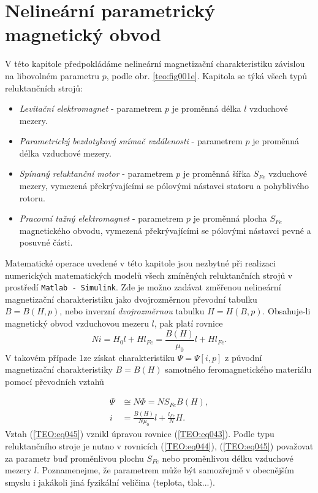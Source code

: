   \section{Nelineární parametrický magnetický obvod}
    V této kapitole předpokládáme nelineární magnetizační charakteristiku závislou na libovolném 
    parametru \(p\), podle obr. \ref{teo:fig001e}. Kapitola se týká všech typů reluktančních strojů:
    \begin{itemize}
      \item  \emph{Levitační elektromagnet} - parametrem \(p\) je proměnná délka \(l\) vzduchové 
             mezery.
      \item \emph{Parametrický bezdotykový snímač vzdálenosti} - parametrem \(p\) je proměnná délka 
            vzduchové mezery.
      \item \emph{Spínaný reluktanční motor} - parametrem \(p\) je proměnná šířka \(S_{Fe}\) 
            vzduchové mezery, vymezená překrývajícími se pólovými nástavci statoru a pohyblivého 
            rotoru.
      \item \emph{Pracovní tažný elektromagnet} - parametrem \(p\) je proměnná plocha \(S_{Fe}\)    
            magnetického obvodu, vymezená překrývajícími se pólovými nástavci pevné a posuvné části.
    \end{itemize}
    
    Matematické operace uvedené v této kapitole jsou nezbytné při realizaci numerických 
    matematických modelů všech zmíněných reluktančních strojů v prostředí \texttt{Matlab - 
    Simulink}. Zde je možno zadávat změřenou nelineární magnetizační charakteristiku jako 
    dvojrozměrnou převodní tabulku \(B = B(H,p)\), nebo inverzní \emph{dvojrozměrnou} tabulku \(H = 
    H(B, p)\). Obsahuje-li magnetický obvod vzduchovou mezeru \(l\), pak platí rovnice
    \begin{equation}\label{TEO:eq043}
      Ni = H_0l + Hl_{Fe} = \frac{B(H)}{\mu_0}l + Hl_{Fe}.
    \end{equation}
    V takovém případe 1ze získat charakteristiku \(\Psi = \Psi[i,p]\) z původní magnetizační 
    charakteristiky \(B=B(H)\) samotného feromagnetického materiálu pomocí převodních vztahů

    \begin{align}
      \Psi &\cong N\Phi = NS_{Fe}B(H),                       \label{TEO:eq044} \\
         i &= \frac{B(H)}{N\mu_0}l + \frac{l_{Fe}}{N}H.      \label{TEO:eq045}
    \end{align} 
    Vztah (\ref{TEO:eq045}) vznikl úpravou rovnice (\ref{TEO:eq043}). Podle typu reluktančního 
    stroje je nutno v rovnicích (\ref{TEO:eq044}), (\ref{TEO:eq045}) považovat za parametr buď 
    proměnlivou plochu \(S_{Fe}\) nebo proměnlivou délku vzduchové mezery \(l\). Poznamenejme, že 
    parametrem může být samozřejmě v obecnějším smyslu i jakákoli jiná fyzikální veličina (teplota, 
    tlak...).

